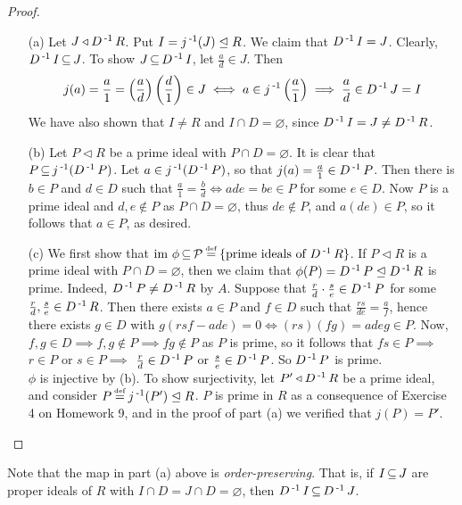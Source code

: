 \documentclass[11pt]{book}
\theoremstyle{definition}   \newtheorem{defn}[counter]{Definition} %
\newcommand{\nsg}{\mathrel{\unlhd}}   \newcommand{\ind}{\parindent24pt}   \newcommand{\vn}{\varnothing}
\newcommand\myeq{\mathrel{\overset{\makebox[0pt]{\mbox{\normalfont\tiny\sffamily \textrm{def}}}}{=}}}
\newcommand{\tl}{\triangleleft}   \newcommand{\sd}[1]{\rtimes_{#1}}   \newcommand{\x}{^{\times}}   \newcommand{\cyc}[1]{\begin{pmatrix} #1 \end{pmatrix}}
\newcommand{\vs}{\vspace{8pt}}
\numberwithin{counter}{chapter}
\begin{document}
\begin{proof}\
\begin{enumerate}
\item[(a)]Let $J \tl D\inv R$. Put $I = j\inv(J) \nsg R$. We claim that $D\operatorname{^{-1}} I = J$. Clearly, $D\operatorname{^{-1}} I \operatorname{\subseteq} J$. To show $J \operatorname{\subseteq} D\operatorname{^{-1}} I$, let $\frac{a}{d} \in J$. Then
	\[j(a) = \frac{a}{1} = \left( \frac{a}{d} \right) \left( \frac{d}{1} \right) \in J \iff a \in j\operatorname{^{-1}} \left(\frac{a}{1} \right) \implies \frac{a}{d} \in D\operatorname{^{-1}} J = I \]
We have also shown that $I \ne R$ and $I \cap D = \vn$, since $D\operatorname{^{-1}} I = J \ne D\operatorname{^{-1}} R$.

\item[(b)] Let $P \tl R$ be a prime ideal with $P \cap D = \vn$. It is clear that $P \operatorname{\subseteq} j\operatorname{^{-1}}(D\operatorname{^{-1}} P)$. Let $a \in j\operatorname{^{-1}}(D\operatorname{^{-1}} P)$, so that $j(a) = \frac{a}{1} \in D\operatorname{^{-1}} P$. Then there is $b \in P$ and $d \in D$ such that $\frac{a}{1} = \frac{b}{d} \iff ade = be \in P$ for some $e \in D$. Now $P$ is a prime ideal and $d,e \notin P$ as $P \cap D = \vn$, thus $de \notin P$, and $a(de) \in P$, so it follows that $a \in P$, as desired.

\item[(c)] We first show that $\im \phi \sub \mc{P} \myeq \{\tn{prime ideals of } D\inv R \}$. If $P \tl R$ is a prime ideal with $P \cap D = \vn$, then we claim that $\phi(P) = D\inv P \nsg D\inv R$ is prime. Indeed, $D\operatorname{^{-1}} P \ne D\operatorname{^{-1}} R$ by $A$. Suppose that $\frac{r}{d} \cdot \frac{s}{e} \in D\operatorname{^{-1}} P$ for some $\frac{r}{d}, \frac{s}{e} \in D\operatorname{^{-1}} R$. Then there exists $a \in P$ and $f \in D$ such that $\frac{rs}{de} = \frac{a}{f}$, hence there exists $g \in D$ with $g(rsf-ade) = 0 \iff (rs)(fg) = adeg \in P$. Now, $f,g \in D \implies f,g \notin P \implies fg \notin P$ as $P$ is prime, so it follows that $fs \in P \implies$ $r \in P$ or $s \in P \implies$ $\frac{r}{d} \in D\operatorname{^{-1}} P$ or $\frac{s}{e} \in D\operatorname{^{-1}} P$. So $D\operatorname{^{-1}} P$ is prime. \\

$\phi$ is injective by (b). To show surjectivity, let $P' \tl D\inv R$ be a prime ideal, and consider $P \myeq j\inv(P') \nsg R$. $P$ is prime in $R$ as a consequence of Exercise 4 on Homework 9, and in the proof of part (a) we verified that $j(P) = P'$.
\end{enumerate}
\end{proof}

\vs

\begin{remark*}
Note that the map in part (a) above is \emph{order-preserving}. That is, if $I\operatorname{\subseteq} J$ are proper ideals of $R$ with $I \cap D = J\cap D = \vn$, then $D\operatorname{^{-1}} I \operatorname{\subseteq} D\operatorname{^{-1}} J$.
\end{remark*}
\end{document}
